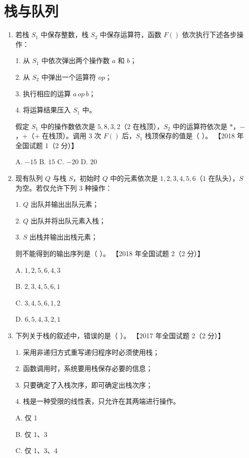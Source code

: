 \documentclass[lang=cn,newtx,10pt,scheme=chinese]{elegantbook}
\begin{document}
\chapter{栈与队列}
\begin{enumerate}
    \item 若栈 $S_1$ 中保存整数，栈 $S_2$ 中保存运算符，函数 $F()$ 依次执行下述各步操作：  
    
    1. 从 $S_1$ 中依次弹出两个操作数 $a$ 和 $b$；  

    2. 从 $S_2$ 中弹出一个运算符 $op$；  

    3. 执行相应的运算 $a \, op \, b$；

    4. 将运算结果压入 $S_1$ 中。  

    假定 $S_1$ 中的操作数依次是 $5, 8, 3, 2$（$2$ 在栈顶），$S_2$ 中的运算符依次是 $*$，$-$，$+$（$+$ 在栈顶）。调用 3 次 $F()$ 后，$S_1$ 栈顶保存的值是（ ）。  
    【2018 年全国试题 1（2 分）】  
    
    A. $-15$ \quad B. $15$ \quad C. $-20$ \quad D. $20$  

    \item 现有队列 $Q$ 与栈 $S$，初始时 $Q$ 中的元素依次是 $1, 2, 3, 4, 5, 6$（$1$ 在队头），$S$ 为空。若仅允许下列 3 种操作：  
    
    1. $Q$ 出队并输出出队元素；  

    2. $Q$ 出队并将出队元素入栈；

    3. $S$ 出栈并输出出栈元素；  

    则不能得到的输出序列是（ ）。  
    【2018 年全国试题 2（2 分）】  

    A. $1, 2, 5, 6, 4, 3$  

    B. $2, 3, 4, 5, 6, 1$  

    C. $3, 4, 5, 6, 1, 2$  

    D. $6, 5, 4, 3, 2, 1$  

    \item 下列关于栈的叙述中，错误的是（ ）。  
    【2017 年全国试题 2（2 分）】  

    1. 采用非递归方式重写递归程序时必须使用栈；

    2. 函数调用时，系统要用栈保存必要的信息；  

    3. 只要确定了入栈次序，即可确定出栈次序；  

    4. 栈是一种受限的线性表，只允许在其两端进行操作。  

    A. 仅 1  

    B. 仅 1、3  

    C. 仅 1、3、4  


\end{enumerate}
\end{document}

